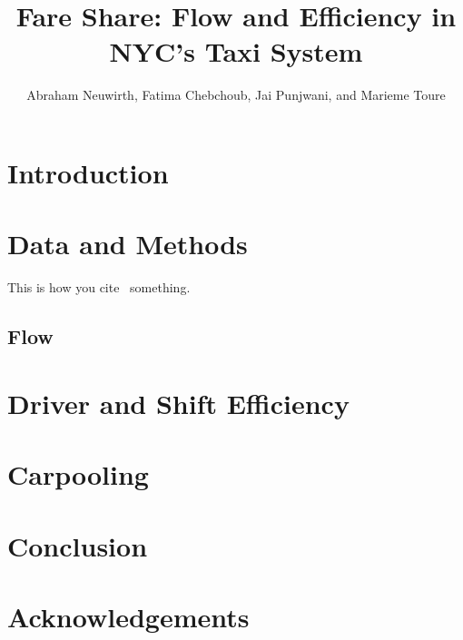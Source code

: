 \documentclass[]{article}
\title{Fare Share: Flow and Efficiency in NYC's Taxi System}
\author{Abraham Neuwirth, Fatima Chebchoub, Jai Punjwani, and Marieme Toure}
\date{\vspace{-5ex}}
\begin{document}
\maketitle


\section{Introduction}


\section{Data and Methods}
This is how you cite~\cite{Farber:2014} something.

\subsection{Flow}

\section{Driver and Shift Efficiency}

\section{Carpooling}

\section{Conclusion}

\section{Acknowledgements}

\vspace{-0.5em}


\end{document}

